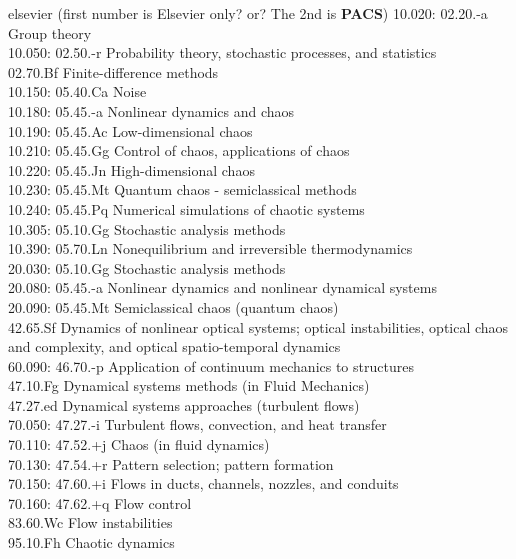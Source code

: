 						\noindent
elsevier (first number is Elsevier only? or? The 2nd is \textbf{PACS})
10.020: 02.20.-a Group theory	\\
10.050: 02.50.-r Probability theory, stochastic processes, and statistics 	\\
        02.70.Bf Finite-difference methods \\
10.150: 05.40.Ca Noise	\\
10.180: 05.45.-a Nonlinear dynamics and chaos	\\
10.190: 05.45.Ac Low-dimensional chaos	\\
10.210: 05.45.Gg Control of chaos, applications of chaos	\\
10.220: 05.45.Jn High-dimensional chaos	\\
10.230: 05.45.Mt Quantum chaos - semiclassical methods	\\
10.240: 05.45.Pq Numerical simulations of chaotic systems	\\
10.305: 05.10.Gg Stochastic analysis methods	\\
10.390: 05.70.Ln Nonequilibrium and irreversible thermodynamics	\\
20.030: 05.10.Gg Stochastic analysis methods	\\
20.080: 05.45.-a Nonlinear dynamics and nonlinear dynamical systems	\\
20.090: 05.45.Mt Semiclassical chaos (quantum chaos)	\\
        42.65.Sf Dynamics of nonlinear optical systems; optical instabilities,
                 optical chaos and complexity, and optical spatio-temporal dynamics \\
60.090: 46.70.-p Application of continuum mechanics to structures	\\
        47.10.Fg 	Dynamical systems methods (in Fluid Mechanics)	\\
        47.27.ed 	Dynamical systems approaches (turbulent flows)	\\
70.050: 47.27.-i Turbulent flows, convection, and heat transfer	\\
70.110: 47.52.+j Chaos (in fluid dynamics)	\\
70.130: 47.54.+r Pattern selection; pattern formation	\\
70.150: 47.60.+i Flows in ducts, channels, nozzles, and conduits	\\
70.160: 47.62.+q Flow control	\\
        83.60.Wc Flow instabilities \\
        95.10.Fh Chaotic dynamics



